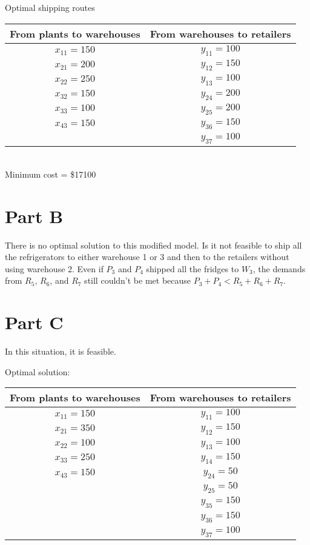 \documentclass[11pt]{scrreprt}
\begin{document}
\subsection{}
Optimal shipping routes \\

\begin{tabular}{|c|c|}
	\hline From plants to warehouses & From warehouses to retailers \\
	\hline $x_{11} = 150$ & $y_{11} = 100$ \\
	\hline $x_{21} = 200$ &$y_{12} = 150$ \\
	\hline $x_{22} = 250$ &$y_{13} = 100$ \\
	\hline $x_{32} = 150$ &$y_{24} = 200$ \\
	\hline $x_{33} = 100$ & $y_{25} = 200$  \\
	\hline $x_{43} = 150$ & $y_{36} = 150$  \\
	\hline & $y_{37} = 100$ \\
	\hline
\end{tabular} \\

Minimum cost = \$17100

\section{Part B}
There is no optimal solution to this modified model. Is it not feasible to ship all the refrigerators to either warehouse 1 or 3 and then to the retailers without using warehouse 2. Even if $P_3$ and $P_4$ shipped all the fridges to $W_3$, the demands from $R_5$, $R_6$, and $R_7$ still couldn't be met because $P_3 + P_4 < R_5 + R_6 + R_7$.

\section{Part C}
In this situation, it is feasible.

Optimal solution:

\begin{tabular}{|c|c|}
	\hline From plants to warehouses & From warehouses to retailers \\
	\hline $x_{11} = 150$ & $y_{11} = 100$ \\
	\hline $x_{21} = 350$ & $y_{12} = 150$ \\
	\hline $x_{22} = 100$ & $y_{13} = 100$  \\
	\hline $x_{33} = 250$ & $y_{14} = 150$  \\
	\hline $x_{43} = 150$ & $y_{24} = 50$  \\
	\hline 				  & $y_{25} = 50$ \\
	\hline 				  & $y_{35} = 150$ \\
	\hline 				  & $y_{36} = 150$ \\
	\hline 				  & $y_{37} = 100$ \\
	\hline
\end{tabular} \\
\end{document}

